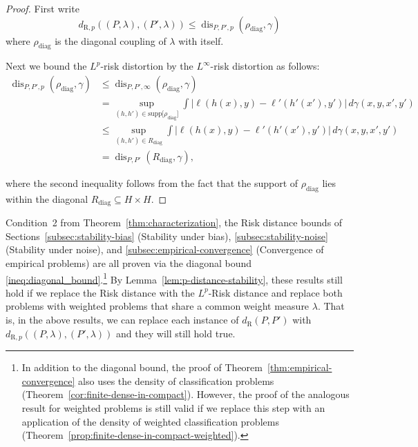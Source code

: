 \documentclass[twoside,11pt]{article}
\newcommand{\dexp}[1][]{d_{\mathrm{R}#1}}
\DeclareMathOperator{\dis}{dis}
\newcommand{\supp}{\mathrm{supp}}
\begin{document}
\begin{proof}
    First write
    \[\dexp[,p]((P,\lambda),(P',\lambda)) \leq 
    \dis_{P,P',p}(\rho_{\mathrm{diag}}, \gamma)\]
    where $\rho_{\mathrm{diag}}$ is the diagonal coupling of $\lambda$ with itself.
    
    Next we bound the $L^p$-risk distortion by the $L^\infty$-risk distortion as follows:
    \begin{align*}
        \dis_{P,P',p}(\rho_{\mathrm{diag}}, \gamma) 
        & \leq \dis_{P,P',\infty}(\rho_{\mathrm{diag}}, \gamma)
        \\ & = \sup_{(h,h')\in \supp{[\rho_{\mathrm{diag}}}]} \int\big| \ell(h(x),y) - \ell'(h'(x'),y')\big|\, d\gamma(x,y,x',y')
        \\ & \leq \sup_{(h,h') \in R_{\mathrm{diag}}} \int \big|\ell(h(x),y) - \ell'(h'(x'),y')\big| \, d\gamma(x,y, x',y')
        \\ & = \dis_{P,P'}(R_{\mathrm{diag}},\gamma),
    \end{align*}
    
    where the second inequality follows from the fact that the support of $\rho_{\mathrm{diag}}$ lies within the diagonal $R_{\mathrm{diag}}\subseteq H\times H$.
\end{proof}
Condition~2 from Theorem~\ref{thm:characterization}, the Risk distance bounds of Sections~\ref{subsec:stability-bias} (Stability under bias), \ref{subsec:stability-noise} (Stability under noise), and \ref{subsec:empirical-convergence} (Convergence of empirical problems) are all proven via the diagonal bound \eqref{ineq:diagonal_bound}.\footnote{In addition to the diagonal bound, the proof of Theorem~\ref{thm:empirical-convergence} also uses the density of classification problems (Theorem~\ref{cor:finite-dense-in-compact}). However, the proof of the analogous result for weighted problems is still valid if we replace this step with an application of the density of weighted classification problems (Theorem~\ref{prop:finite-dense-in-compact-weighted}).}
By Lemma~\ref{lem:p-distance-stability}, these results still hold if we replace the Risk distance with the $L^p$-Risk distance and replace both problems with weighted problems that share a common weight measure $\lambda$.
That is, in the above results, we can replace each instance of $\dexp(P,P')$ with $\dexp[,p]((P,\lambda), (P',\lambda))$ and they will still hold true.
\end{document}
